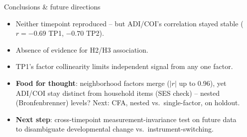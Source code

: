 \documentclass[final]{beamer}
\newlength{\sepwidth}
\newlength{\colwidth}
\newcommand{\separatorcolumn}{\begin{column}{\sepwidth}\end{column}}
\begin{document}
\begin{frame}[t]
\begin{columns}[t]
\begin{column}{\colwidth}
  \vspace{-0.6cm}

  \begin{block}{Conclusions \& future directions}
    \vspace{-0.35cm}
      \begin{itemize}
        \setlength\itemsep{0.15em}
        \item Neither timepoint reproduced -- but ADI/COI's correlation
          stayed stable ($r=-0.69$ TP1, $-0.70$ TP2).
        \item Absence of evidence for H2/H3 association.
        \item TP1's factor collinearity limits independent signal from
          any one factor.
        \item \textbf{Food for thought}: neighborhood factors merge
          ($|r|$ up to 0.96), yet ADI/COI stay distinct from household
          items (SES check) -- nested (Bronfenbrenner) levels? Next:
          CFA, nested vs.\ single-factor, on holdout.
        \item \textbf{Next step}: cross-timepoint measurement-invariance test on future data to disambiguate developmental change vs.\ instrument-switching.
      \end{itemize}
  \end{block}

  \vspace{-0.3cm}

\end{column}

\separatorcolumn
\end{columns}
\end{frame}
\end{document}
